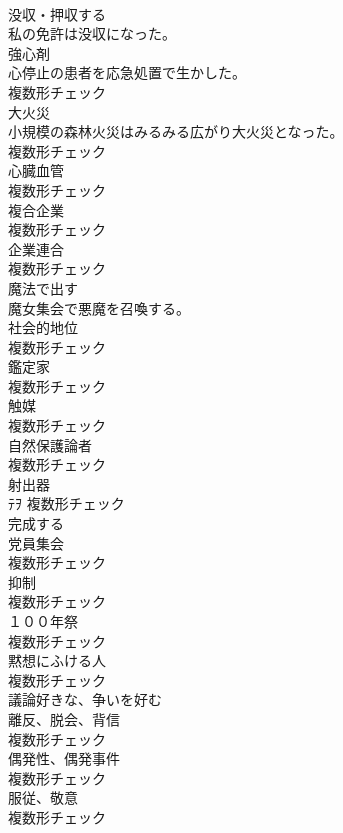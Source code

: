 \documentclass[8pt]{extreport}
\begin{document}
\begin{CJK}{UTF8}{min}
\\	[動詞]	没収・押収する	
\\	私の免許は没収になった。	
\\	[名詞]	強心剤	
\\	心停止の患者を応急処置で生かした。	
\\	複数形チェック
\\	[名詞]	大火災	
\\	小規模の森林火災はみるみる広がり大火災となった。	
\\	複数形チェック
\\	[名詞]	心臓血管	
\\	複数形チェック
\\	[名詞]	複合企業	
\\	複数形チェック
\\	[名詞]	企業連合	
\\	複数形チェック
\\	[動詞]	魔法で出す	
\\	魔女集会で悪魔を召喚する。	
\\	[名詞]	社会的地位	
\\	複数形チェック
\\	[名詞]	鑑定家	
\\	複数形チェック
\\	[名詞]	触媒	
\\	複数形チェック
\\	[名詞]	自然保護論者	
\\	複数形チェック
\\	[名詞]	射出器	
\\	ﾃｦ	複数形チェック
\\	[動詞]	完成する	
\\	[名詞]	党員集会	
\\	複数形チェック
\\	[名詞]	抑制	
\\	複数形チェック
\\	[名詞]	１００年祭	
\\	複数形チェック
\\	[名詞]	黙想にふける人	
\\	複数形チェック
\\	[形容詞]	議論好きな、争いを好む	
\\	[名詞]	離反、脱会、背信	
\\	複数形チェック
\\	[名詞]	偶発性、偶発事件	
\\	複数形チェック
\\	[名詞]	服従、敬意	
\\	複数形チェック

\end{CJK}
\end{document}
